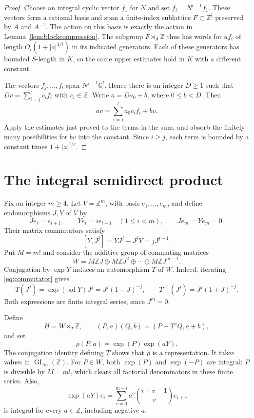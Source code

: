\documentclass[11pt,letterpaper]{amsart}
\numberwithin{equation}{section}
\theoremstyle{remark}
\newcommand{\Z}{\mathbb Z}
\newcommand{\Q}{\mathbb Q}
\newcommand{\GL}{\operatorname{GL}}
\newcommand{\ad}{\operatorname{ad}}
\begin{document}
\begin{proof}
Choose an integral cyclic vector $f_1$ for $N$ and set
$f_i=N^{i-1}f_1$. These vectors form a rational basis and span a
finite-index sublattice $F\subset\Z^l$ preserved by $A$ and $A^{-1}$.
The action on this basis is exactly the action in
Lemma~\ref{lem:blockcompression}. The subgroup $F\rtimes_A\Z$ thus
has words for $af_i$ of length $O_l(1+|a|^{1/i})$ in its indicated
generators. Each of these generators has bounded $S$-length in $K$,
so the same upper estimates hold in $K$ with a different constant.

The vectors $f_j,\ldots,f_l$ span $N^{j-1}\Q^l$. Hence there is an
integer $D\ge1$ such that
$Dv=\sum_{i=j}^l c_i f_i$ with $c_i\in\Z$. Write
$a=Da_0+b$, where $0\le b<D$. Then
\[
 av=\sum_{i=j}^l a_0c_i f_i+bv.
\]
Apply the estimates just proved to the terms in the sum, and absorb the
finitely many possibilities for $bv$ into the constant. Since $i\ge j$,
each term is bounded by a constant times $1+|a|^{1/j}$.
\end{proof}

\section{The integral semidirect product}\label{sec:group}

Fix an integer $m\ge4$. Let $V=\Z^m$, with basis $e_1,\ldots,e_m$,
and define endomorphisms $J,Y$ of $V$ by
\[
 Je_i=e_{i+1},\qquad Ye_i=i e_{i+1}\quad(1\le i<m),
 \qquad Je_m=Ye_m=0.
\]
Their matrix commutators satisfy
\begin{equation}\label{eq:commutator}
 [Y,J^j]=YJ^j-J^jY=jJ^{j+1}.
\end{equation}
Put $M=m!$ and consider the additive group of commuting matrices
\[
 W=M\Z J\oplus M\Z J^2\oplus\cdots\oplus M\Z J^{m-1}.
\]
Conjugation by $\exp Y$ induces an automorphism $T$ of $W$. Indeed,
iterating \eqref{eq:commutator} gives
\begin{equation}\label{eq:T}
 T(J^j)=\exp(\ad Y)J^j=J^j(1-J)^{-j},\qquad
 T^{-1}(J^j)=J^j(1+J)^{-j}.
\end{equation}
Both expressions are finite integral series, since $J^m=0$.

Define
\[
 H=W\rtimes_T\Z,\qquad
 (P,a)(Q,b)=(P+T^aQ,a+b),
\]
and set
\begin{equation}\label{eq:rho}
 \rho(P,a)=\exp(P)\exp(aY).
\end{equation}
The conjugation identity defining $T$ shows that $\rho$ is a
representation. It takes values in $\GL_m(\Z)$. For $P\in W$, both
$\exp(P)$ and $\exp(-P)$ are integral: $P$ is divisible by $M=m!$,
which clears all factorial denominators in these finite series. Also,
\begin{equation}\label{eq:expY}
 \exp(aY)e_i=\sum_{v=0}^{m-i}a^v\binom{i+v-1}{v}e_{i+v}
\end{equation}
is integral for every $a\in\Z$, including negative $a$.
\end{document}
